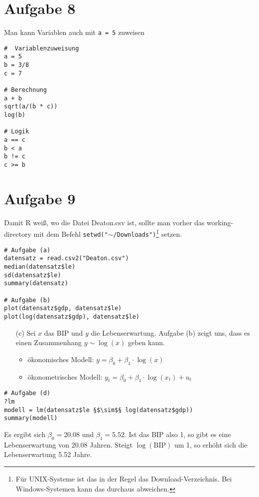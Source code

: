 \documentclass{article}
\begin{document}
	\section*{Aufgabe 8}
	Man kann Variablen auch mit \texttt{a = 5} zuweisen
	\begin{lstlisting}[style=R]
#  Variablenzuweisung
a = 5
b = 3/8
c = 7

# Berechnung
a + b
sqrt(a/(b * c))
log(b)

# Logik
a == c
b < a
b != c
c >= b
	\end{lstlisting}
	
	\section*{Aufgabe 9}
	Damit R weiß, wo die Datei Deaton.csv ist, sollte man vorher das working-directory mit dem Befehl \texttt{setwd("$\sim$/Downloads")}\footnote{Für UNIX-Systeme ist das in der Regel das Download-Verzeichnis. Bei Windows-Systemen kann das durchaus abweichen.} setzen.
	\begin{lstlisting}[style=R]
# Aufgabe (a)
datensatz = read.csv2("Deaton.csv")
median(datensatz$le)
sd(datensatz$le)
summary(datensatz)

# Aufgabe (b)
plot(datensatz$gdp, datensatz$le)
plot(log(datensatz$gdp), datensatz$le)
	\end{lstlisting}
	\begin{itemize}
		\item[(c)] Sei $x$ das BIP und $y$ die Lebenserwartung. Aufgabe (b) zeigt uns, dass es einen Zusammenhang $y \sim \log(x)$ geben kann.
		\begin{itemize}
			\item ökonomisches Modell: $y = \beta_0 + \beta_1\cdot\log(x)$
			\item ökonometrisches Modell: $y_t = \beta_0 + \beta_1\cdot\log(x_t) + u_t$
		\end{itemize}
	\end{itemize}
	\begin{lstlisting}[style=R]
# Aufgabe (d)
?lm
modell = lm(datensatz$le §$\sim$§ log(datensatz$gdp))
summary(modell)
	\end{lstlisting}
Es ergibt sich $\beta_0 = 20.08$ und $\beta_1 = 5.52$. Ist das BIP also 1, so gibt es eine Lebenserwartung von 20.08 Jahren. Steigt $\log(\text{BIP})$ um 1, so erhöht sich die Lebenserwartung 5.52 Jahre.
\end{document}
